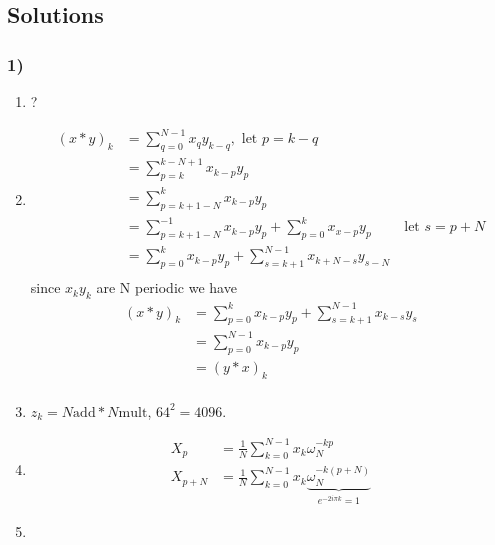 \subsection{Solutions}
\label{subsec:Solutions}
\subsubsection{1)}
\begin{enumerate}[label={(\alph*)}]
    \item ?
    \item 
        \begin{align*}
            \left( x*y\right) _k &= \sum_{q=0}^{N-1} x_qy_{k-q} , \text{ let } p = k-q  \\
                                 &= \sum_{p=k}^{k-N+1} x_{k-p}y_p  \\ 
                                 &= \sum_{p=k+1-N}^{k} x_{k-p}y_p \\ 
                                 &= \sum_{p=k+1-N}^{-1} x_{k-p}y_p + \sum_{p=0}^{k}
                                 x_{x-p}y_p \qquad \text{ let } s = p+N \\ 
                                 &= \sum_{p=0}^{k} x_{k-p}y_p + \sum_{s=k+1}^{N-1}
                                 x_{k+N-s}y_{s-N}   \\ 
        \end{align*}
        since $ x_ky_k $ are N periodic we have 
        \begin{align*}
           \left( x*y\right) _k  &= \sum_{p=0}^{k} x_{k-p}y_p 
           + \sum_{s=k+1}^{N-1} x_{k-s}y_{s}   \\  
                                 &= \sum_{p=0}^{N-1} x_{k-p}y_p \\ 
                                  &= \left( y*x\right)_k \\ 
        \end{align*}
    \item $ z_k = N\text{add}*N\text{mult}   $,  $ 64^2 = 4096 $. 
    \item 
        \begin{align*}
            X_p &= \frac{ 1 }{ N } \sum_{k=0}^{N-1} x_k\omega _{ N }^{ -kp } \\
            X_{p+N} &= \frac{ 1 }{ N } \sum_{k=0}^{N-1} x_k \underbrace{\omega _{ N }^{
            -k(p+N) }}_{ e^{ -2i\pi k} = 1} 
        \end{align*}
    \item 
        \begin{align*}

\end{align*}
\end{enumerate}
